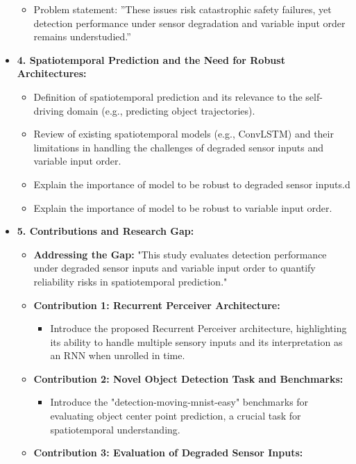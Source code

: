 \begin{itemize}
\begin{itemize}
        \item Problem statement: ”These issues risk catastrophic safety failures, yet detection performance under sensor degradation and variable input order remains understudied.”
    \end{itemize}
    \item \textbf{4. Spatiotemporal Prediction and the Need for Robust Architectures:}
    \begin{itemize}
        \item Definition of spatiotemporal prediction and its relevance to the self-driving domain (e.g., predicting object trajectories).
        \item Review of existing spatiotemporal models (e.g., ConvLSTM) and their limitations in handling the challenges of degraded sensor inputs and variable input order.
        \item Explain the importance of model to be robust to degraded sensor inputs.d
        \item Explain the importance of model to be robust to variable input order.
    \end{itemize}
    \item \textbf{5. Contributions and Research Gap:}
    \begin{itemize}
        \item \textbf{Addressing the Gap:} "This study evaluates detection performance under degraded sensor inputs and variable input order to quantify reliability risks in spatiotemporal prediction."
        \item \textbf{Contribution 1: Recurrent Perceiver Architecture:}
        \begin{itemize}
            \item Introduce the proposed Recurrent Perceiver architecture, highlighting its ability to handle multiple sensory inputs and its interpretation as an RNN when unrolled in time.
        \end{itemize}
        \item \textbf{Contribution 2: Novel Object Detection Task and Benchmarks:}
        \begin{itemize}
            \item Introduce the "detection-moving-mnist-easy" benchmarks for evaluating object center point prediction, a crucial task for spatiotemporal understanding.
        \end{itemize}
        \item \textbf{Contribution 3: Evaluation of Degraded Sensor Inputs:}

\end{itemize}
\end{itemize}
